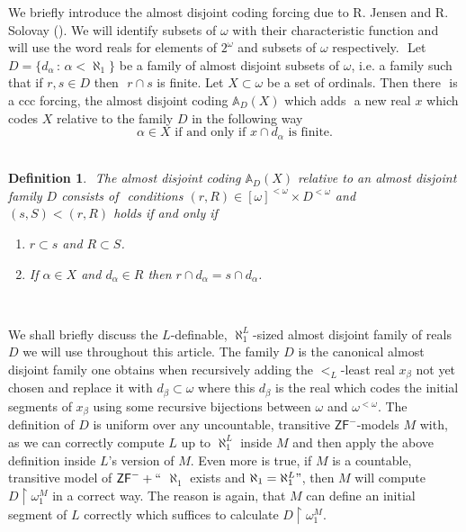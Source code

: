 \documentclass[a4paper,11pt]{article}
\newtheorem{definition}[theorem]{Definition}
\newcommand{\ZFP}{\mathsf{ZF}^-}
\begin{document}
We briefly introduce the almost disjoint coding forcing due to R. Jensen and R. Solovay (\cite{JensenSolovay}). We will identify subsets of $\omega$ with their characteristic function and will use the word reals for elements of $2^{\omega}$ and subsets of $\omega$ respectively.
    ﻿
    Let $D=\{d_{\alpha} \, : \, \alpha < \aleph_1 \}$ be a family of almost disjoint subsets of $\omega$, i.e. a family such that if $r, s \in D$ then 
    ﻿
    $r \cap s$ is finite. Let $X\subset  \omega$  be a set of ordinals. Then there 
    ﻿
    is a ccc forcing, the almost disjoint coding $\mathbb{A}_D(X)$ which adds 
    ﻿
    a new real $x$ which codes $X$ relative to the family $D$ in the following way
    ﻿
    $$\alpha \in X \text{ if and only if } x \cap d_{\alpha} \text{ is finite.}$$
    ﻿
    \begin{definition}\label{definitionadcoding}
    ﻿
     The almost disjoint coding $\mathbb{A}_D(X)$ relative to an almost disjoint family $D$ consists of
    ﻿
     conditions $(r, R) \in [\omega]^{<\omega} \times D^{<\omega}$ and
    ﻿
     $(s,S) < (r,R)$ holds if and only if
    ﻿
     \begin{enumerate}
    ﻿
      \item $r \subset s$ and $R \subset S$.
    ﻿
      \item If $\alpha \in X$ and $d_{\alpha} \in R$ then $r \cap d_{\alpha} = s \cap d_{\alpha}$.
    ﻿
     \end{enumerate}
    ﻿
    \end{definition}
We shall briefly discuss the $L$-definable, $\aleph_1^L$-sized almost disjoint family of reals $D$  we will use throughout this article. The family $D$ is the canonical almost disjoint family one obtains when recursively adding the $<_L$-least real $x_{\beta}$ not yet chosen and replace it with $d_{\beta} \subset \omega$ where this $d_{\beta}$  is the real which codes the initial segments of $x_{\beta}$ using some recursive bijections between $\omega$ and $\omega^{<\omega}$. The definition of $D$ is uniform over any uncountable, transitive $\ZFP$-models $M$ with, as we can correctly compute $L$ up to $\aleph_1^L$ inside $M$ and then apply the above definition inside $L$'s version of $M$. Even more is true, if $M$ is a countable, transitive model of $\ZFP+``$ $\aleph_1$ exists and $\aleph_1=\aleph_1^L"$, then $M$ will compute $D \upharpoonright \omega_1^M$ in a correct way. The reason is again, that $M$ can define an initial segment of $L$ correctly which suffices to calculate $D \upharpoonright \omega_1^M$.
    ﻿
    ﻿
    
\end{document}
